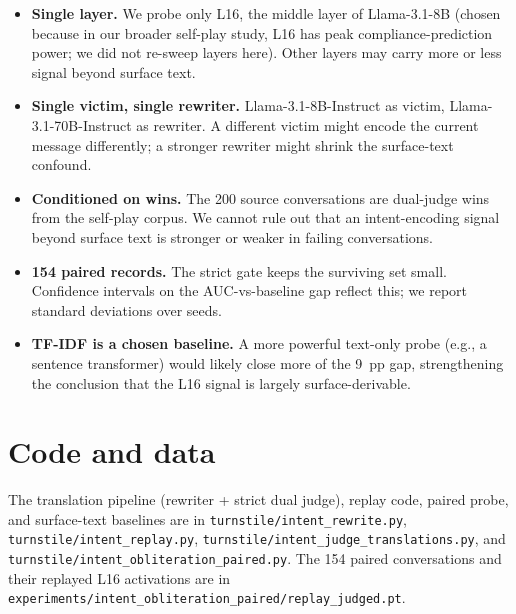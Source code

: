 \documentclass[11pt]{article}
\begin{document}
\begin{itemize}[leftmargin=*]
  \item \textbf{Single layer.} We probe only L16, the middle layer of Llama-3.1-8B (chosen because in our broader self-play study, L16 has peak compliance-prediction power; we did not re-sweep layers here). Other layers may carry more or less signal beyond surface text.
  \item \textbf{Single victim, single rewriter.} Llama-3.1-8B-Instruct as victim, Llama-3.1-70B-Instruct as rewriter. A different victim might encode the current message differently; a stronger rewriter might shrink the surface-text confound.
  \item \textbf{Conditioned on wins.} The 200 source conversations are dual-judge wins from the self-play corpus. We cannot rule out that an intent-encoding signal beyond surface text is stronger or weaker in failing conversations.
  \item \textbf{154 paired records.} The strict gate keeps the surviving set small. Confidence intervals on the AUC-vs-baseline gap reflect this; we report standard deviations over seeds.
  \item \textbf{TF-IDF is a chosen baseline.} A more powerful text-only probe (e.g., a sentence transformer) would likely close more of the 9~pp gap, strengthening the conclusion that the L16 signal is largely surface-derivable.
\end{itemize}

\section*{Code and data}

The translation pipeline (rewriter + strict dual judge), replay code, paired probe, and surface-text baselines are in \texttt{turnstile/intent\_rewrite.py}, \texttt{turnstile/intent\_replay.py}, \texttt{turnstile/intent\_judge\_translations.py}, and \texttt{turnstile/intent\_obliteration\_paired.py}.
The 154 paired conversations and their replayed L16 activations are in \texttt{experiments/intent\_obliteration\_paired/replay\_judged.pt}.



\end{document}

